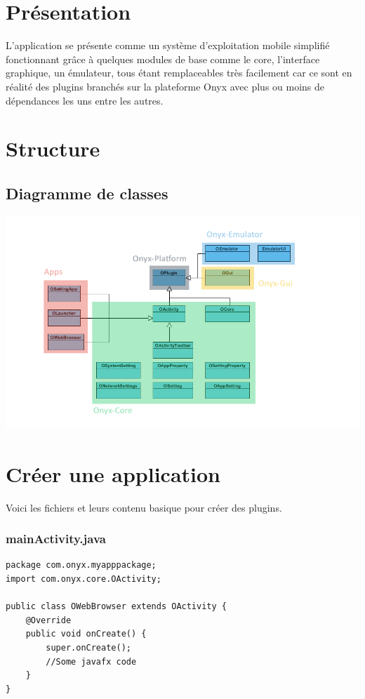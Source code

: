 \section{Présentation}
L'application se présente comme un système d'exploitation mobile simplifié fonctionnant grâce à quelques modules de base comme le core, l'interface graphique, un émulateur, tous étant remplaceables très facilement car ce sont en réalité des plugins branchés sur la plateforme Onyx avec plus ou moins de dépendances les uns entre les autres.

\section{Structure}

\subsection{Diagramme de classes}
\includegraphics[width=20cm]{figures/class_diagram_app.png}

\section{Créer une application}

Voici les fichiers et leurs contenu basique pour créer des plugins.
\subsubsection{mainActivity.java}
\begin{verbatim}
package com.onyx.myapppackage;
import com.onyx.core.OActivity;

public class OWebBrowser extends OActivity {
    @Override
    public void onCreate() {
        super.onCreate();
        //Some javafx code
    }
}
\end{verbatim}

